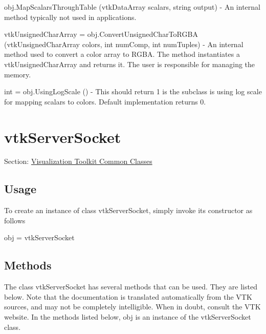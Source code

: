 \begin{DoxyItemize}
\item {\ttfamily obj.\-Map\-Scalars\-Through\-Table (vtk\-Data\-Array scalars, string output)} -\/ An internal method typically not used in applications.  
\item {\ttfamily vtk\-Unsigned\-Char\-Array = obj.\-Convert\-Unsigned\-Char\-To\-R\-G\-B\-A (vtk\-Unsigned\-Char\-Array colors, int num\-Comp, int num\-Tuples)} -\/ An internal method used to convert a color array to R\-G\-B\-A. The method instantiates a vtk\-Unsigned\-Char\-Array and returns it. The user is responsible for managing the memory.  
\item {\ttfamily int = obj.\-Using\-Log\-Scale ()} -\/ This should return 1 is the subclass is using log scale for mapping scalars to colors. Default implementation returns 0.  
\end{DoxyItemize}\hypertarget{vtkcommon_vtkserversocket}{}\section{vtk\-Server\-Socket}\label{vtkcommon_vtkserversocket}
Section\-: \hyperlink{sec_vtkcommon}{Visualization Toolkit Common Classes} \hypertarget{vtkwidgets_vtkxyplotwidget_Usage}{}\subsection{Usage}\label{vtkwidgets_vtkxyplotwidget_Usage}
To create an instance of class vtk\-Server\-Socket, simply invoke its constructor as follows \begin{DoxyVerb}  obj = vtkServerSocket
\end{DoxyVerb}
 \hypertarget{vtkwidgets_vtkxyplotwidget_Methods}{}\subsection{Methods}\label{vtkwidgets_vtkxyplotwidget_Methods}
The class vtk\-Server\-Socket has several methods that can be used. They are listed below. Note that the documentation is translated automatically from the V\-T\-K sources, and may not be completely intelligible. When in doubt, consult the V\-T\-K website. In the methods listed below, {\ttfamily obj} is an instance of the vtk\-Server\-Socket class. 
